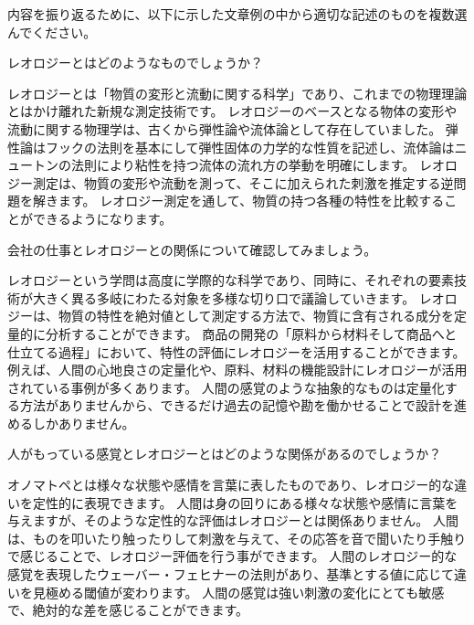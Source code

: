\documentclass[uplatex,dvipdfmx,a4paper,11pt]{jsreport}
\begin{document}
\newpage

内容を振り返るために、以下に示した文章例の中から適切な記述のものを複数選んでください。
\begin{qlist}
	\qitem レオロジーとはどのようなものでしょうか？
		\begin{qlist2}
			\qitem レオロジーとは「物質の変形と流動に関する科学」であり、これまでの物理理論とはかけ離れた新規な測定技術です。
			\qitem レオロジーのベースとなる物体の変形や流動に関する物理学は、古くから弾性論や流体論として存在していました。
			\qitem 弾性論はフックの法則を基本にして弾性固体の力学的な性質を記述し、流体論はニュートンの法則により粘性を持つ流体の流れ方の挙動を明確にします。
			\qitem レオロジー測定は、物質の変形や流動を測って、そこに加えられた刺激を推定する逆問題を解きます。
			\qitem レオロジー測定を通して、物質の持つ各種の特性を比較することができるようになります。
    \end{qlist2}
    \vspace{3mm}
	\qitem 会社の仕事とレオロジーとの関係について確認してみましょう。
		\begin{qlist2}
			\qitem レオロジーという学問は高度に学際的な科学であり、同時に、それぞれの要素技術が大きく異る多岐にわたる対象を多様な切り口で議論していきます。
			\qitem レオロジーは、物質の特性を絶対値として測定する方法で、物質に含有される成分を定量的に分析することができます。
			\qitem 商品の開発の「原料から材料そして商品へと仕立てる過程」において、特性の評価にレオロジーを活用することができます。
            \qitem 例えば、人間の心地良さの定量化や、原料、材料の機能設計にレオロジーが活用されている事例が多くあります。
            \qitem 人間の感覚のような抽象的なものは定量化する方法がありませんから、できるだけ過去の記憶や勘を働かせることで設計を進めるしかありません。
    \end{qlist2}
    \vspace{3mm}
	\qitem 人がもっている感覚とレオロジーとはどのような関係があるのでしょうか？
		\begin{qlist2}
            \qitem オノマトペとは様々な状態や感情を言葉に表したものであり、レオロジー的な違いを定性的に表現できます。
            \qitem 人間は身の回りにある様々な状態や感情に言葉を与えますが、そのような定性的な評価はレオロジーとは関係ありません。
			\qitem 人間は、ものを叩いたり触ったりして刺激を与えて、その応答を音で聞いたり手触りで感じることで、レオロジー評価を行う事ができます。
			\qitem 人間のレオロジー的な感覚を表現したウェーバー・フェヒナーの法則があり、基準とする値に応じて違いを見極める閾値が変わります。
            \qitem 人間の感覚は強い刺激の変化にとても敏感で、絶対的な差を感じることができます。

\end{qlist2}
\end{qlist}
\end{document}
